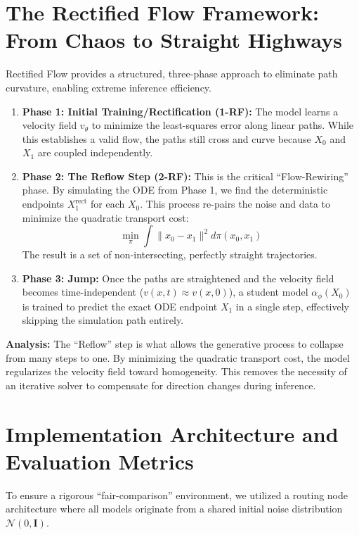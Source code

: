 \documentclass[11pt,a4paper]{article}
\begin{document}
\section{The Rectified Flow Framework: From Chaos to Straight Highways}
Rectified Flow provides a structured, three-phase approach to eliminate path curvature, enabling extreme inference efficiency\cite{90}.

\begin{enumerate}
    \item \textbf{Phase 1: Initial Training/Rectification (1-RF):} The model learns a velocity field $v_\theta$ to minimize the least-squares error along linear paths\cite{90}. While this establishes a valid flow, the paths still cross and curve because $X_0$ and $X_1$ are coupled independently\cite{90}.
    \item \textbf{Phase 2: The Reflow Step (2-RF):} This is the critical ``Flow-Rewiring'' phase\cite{90}. By simulating the ODE from Phase 1, we find the deterministic endpoints $X^{\text{rect}}_1$ for each $X_0$\cite{90}. This process re-pairs the noise and data to minimize the quadratic transport cost\cite{90}:
    \begin{equation}
    \min_\pi \int \|x_0 - x_1\|^2 d\pi(x_0, x_1)
    \end{equation}
    The result is a set of non-intersecting, perfectly straight trajectories\cite{90}.
    \item \textbf{Phase 3: Jump:} Once the paths are straightened and the velocity field becomes time-independent ($v(x, t) \approx v(x, 0)$), a student model $\alpha_\phi(X_0)$ is trained to predict the exact ODE endpoint $X_1$ in a single step, effectively skipping the simulation path entirely\cite{90}.
\end{enumerate}

\noindent\textbf{Analysis:} The ``Reflow'' step is what allows the generative process to collapse from many steps to one\cite{90}. By minimizing the quadratic transport cost, the model regularizes the velocity field toward homogeneity\cite{90}. This removes the necessity of an iterative solver to compensate for direction changes during inference\cite{90}.

\section{Implementation Architecture and Evaluation Metrics}
To ensure a rigorous ``fair-comparison'' environment, we utilized a routing node architecture where all models originate from a shared initial noise distribution $\mathcal{N}(0, \mathbf{I})$\cite{87}.
\end{document}
